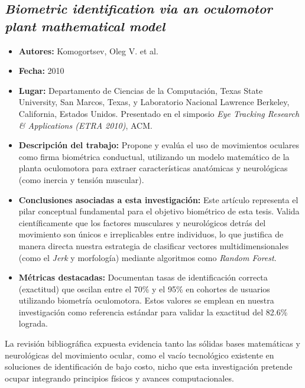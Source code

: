 \subsection{\textit{Biometric identification via an oculomotor plant mathematical model}}
\begin{itemize}
	\item \textbf{Autores:} Komogortsev, Oleg V. et al. \cite{komogortsev2010}
	\item \textbf{Fecha:} 2010
	\item \textbf{Lugar:} Departamento de Ciencias de la Computación, Texas State University, San Marcos, Texas, y Laboratorio Nacional Lawrence Berkeley, California, Estados Unidos. Presentado en el simposio \textit{Eye Tracking Research \& Applications (ETRA 2010)}, ACM.
	\item \textbf{Descripción del trabajo:} Propone y evalúa el uso de movimientos oculares como firma biométrica conductual, utilizando un modelo matemático de la planta oculomotora para extraer características anatómicas y neurológicas (como inercia y tensión muscular).
	\item \textbf{Conclusiones asociadas a esta investigación:} Este artículo representa el pilar conceptual fundamental para el objetivo biométrico de esta tesis. Valida científicamente que los factores musculares y neurológicos detrás del movimiento son únicos e irreplicables entre individuos, lo que justifica de manera directa nuestra estrategia de clasificar vectores multidimensionales (como el \textit{Jerk} y morfología) mediante algoritmos como \textit{Random Forest}.
	\item \textbf{Métricas destacadas:} Documentan tasas de identificación correcta (exactitud) que oscilan entre el 70\% y el 95\% en cohortes de usuarios utilizando biometría oculomotora. Estos valores se emplean en nuestra investigación como referencia estándar para validar la exactitud del 82.6\% lograda.
\end{itemize}

La revisión bibliográfica expuesta evidencia tanto las sólidas bases matemáticas y neurológicas del movimiento ocular, como el vacío tecnológico existente en soluciones de identificación de bajo costo, nicho que esta investigación pretende ocupar integrando principios físicos y avances computacionales.

